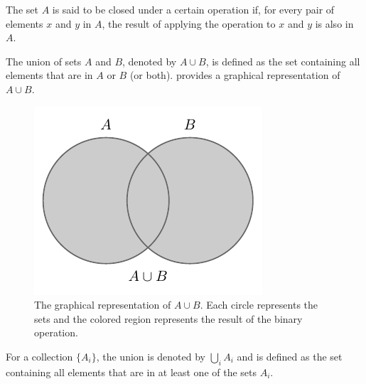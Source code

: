 \begin{definition}[Closure]
	The set $A$ is said to be closed under a certain operation if, for every pair of elements $x$ and $y$ in $A$, the result of applying the operation to $x$ and $y$ is also in $A$.
\end{definition}

\begin{definition}[Union]
	The union of sets $A$ and $B$, denoted by $A \cup B$, is defined as the set containing all elements that are in $A$ or $B$ (or both).  provides a graphical representation of $A \cup B$.
	\begin{figure}[h]
		\centering
		\includegraphics[]{figures/set_union.pdf}
		\caption{The graphical representation of $A\cup B$. Each circle represents the sets and the colored region represents the result of the binary operation.}
		\label{fig:set_union}
	\end{figure}
\end{definition}

\begin{definition}
	For a collection $\{A_i\}$, the union is denoted by $\bigcup_{i} A_i$ and is defined as the set containing all elements that are in at least one of the sets $A_i$.
\end{definition}


